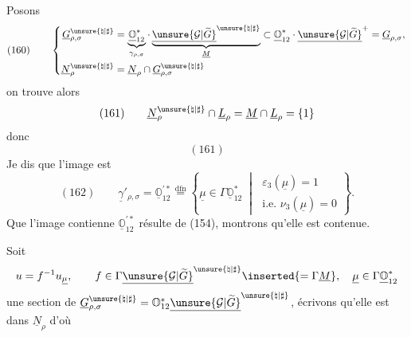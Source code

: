 Posons
\[
(160)\qquad\left\{
\begin{aligned}
\underline G_{\rho,\sigma}^{\unsure{\natural|\sharp}}
&=\underbrace{\underline{\mathbb O}_{12}^{*}}_{\gamma_{\rho,\sigma}}\cdot
\underbrace{\underline{\unsure{\mathcal G|\widetilde G}}^{\unsure{\natural|\sharp}}}_{\underline M}
\subset\underline{\mathbb O}_{12}^{*}\cdot\underline{\unsure{\mathcal G|\widetilde G}}^{+}
=\underline G_{\rho,\sigma},\\
\underline N_\rho^{\unsure{\natural|\sharp}}
&=\underline N_\rho\cap\underline G_{\rho,\sigma}^{\unsure{\natural|\sharp}}
\end{aligned}\right.
\]
on trouve alors
\[
(161)\qquad
\underline N_\rho^{\unsure{\natural|\sharp}}\cap\underline L_\rho
=\underline M\cap\underline L_\rho=\{1\}
\]
donc
\[
(161)
\]
Je dis que l'image est
\[
(162)\qquad
\underline\gamma'_{\rho,\sigma}
=\underline{\mathbb O}_{12}^{\prime *}
\overset{\mathrm{dfn}}{=}
\left\{\underline\mu\in\Gamma\underline{\mathbb O}_{12}^{*}\;\middle|\;
\begin{gathered}\varepsilon_3(\underline\mu)=1\\\text{i.e. }\nu_3(\underline\mu)=0\end{gathered}\right\}.
\]
Que l'image contienne $\underline{\mathbb O}_{12}^{\prime *}$ résulte de (154), montrons qu'elle est contenue.

Soit
\[
u=f^{-1}u_{\underline\mu},\qquad
f\in\Gamma\underline{\unsure{\mathcal G|\widetilde G}}^{\unsure{\natural|\sharp}}\inserted{=\Gamma\underline M},\quad
\underline\mu\in\Gamma\underline{\mathbb O}_{12}^{*}
\]
une section  de
$\underline G_{\rho,\sigma}^{\unsure{\natural|\sharp}}
=\mathbb O_{12}^{*}\underline{\unsure{\mathcal G|\widetilde G}}^{\unsure{\natural|\sharp}}$,
écrivons qu'elle est dans $\underline N_\rho$ d'où

